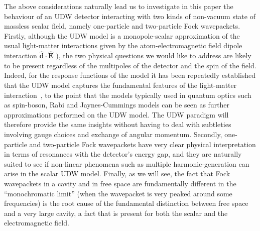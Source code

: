 \documentclass[11pt,prd,onecolumn,superscriptaddress,nofootinbib,floatfix,amsmath,amssymb]{revtex4-2}
\begin{document}
    The above considerations naturally lead us to investigate in this paper the behaviour of an UDW detector interacting with two kinds of non-vacuum state of massless scalar field, namely one-particle and two-particle Fock wavepackets. Firstly, although the UDW model is a monopole-scalar approximation of the usual light-matter interactions given by the atom-electromagnetic field dipole interaction $\hat{\bm{d}}\cdot\hat{\bm{E}}$ \cite{Lopp2021Rontgen}), the two physical questions we would like to address are likely to be present regardless of the multipoles of the detector and the spin of the field. Indeed, for the response functions of the model it has been repeatedly established that the UDW model captures the fundamental features of the light-matter interaction~\cite{Pablo2018rqo,Pozas2016}, to the point that the models typically used in quantum optics such as spin-boson, Rabi and Jaynes-Cummings models can be seen as further approximations performed on the UDW model. The UDW paradigm will therefore provide the same insights without having to deal with subtleties involving gauge choices and exchange of angular momentum. Secondly, one-particle and two-particle Fock wavepackets have very clear physical interpretation in terms of resonances with the detector's energy gap, and they are naturally suited to see if non-linear phenomena such as multiple harmonic-generation can arise in the scalar UDW model. Finally, as we will see, the fact that Fock wavepackets in a cavity and in free space are fundamentally different in the ``monochromatic limit'' (when the wavepacket is very peaked around some frequencies) is the root cause of the fundamental distinction between free space and a very large cavity, a fact that is present for both the scalar and the electromagnetic field.

    
   
\end{document}
